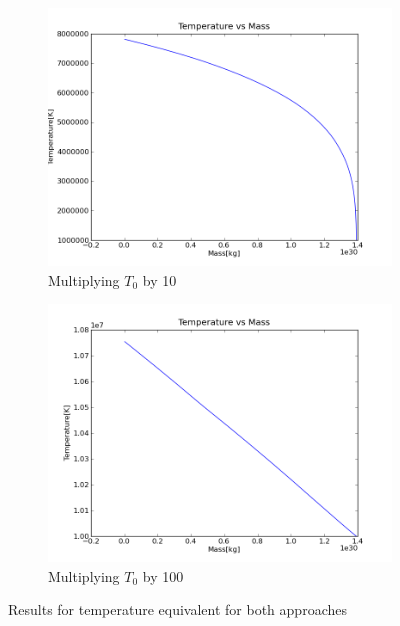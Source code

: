 \documentclass[a4paper,12pt]{article}
\begin{document}
\begin{figure}[H]
    \centering
    \begin{subfigure}{0.49\textwidth}
      \includegraphics[width=\textwidth]{Calculate_density/Temperature_for_rho_p_t_others_constant_Ttimes10}
      \caption{Multiplying $T_0$ by 10}
      \label{fig:temperature_density_Ttimes10}
    \end{subfigure}
    \begin{subfigure}{0.49\textwidth}
      \includegraphics[width=\textwidth]{Calculate_density/Temperature_for_rho_p_t_others_constant_Ttimes100}
      \caption{Multiplying $T_0$ by 100}
      \label{fig:temperature_pressure_Ttimes100}
    \end{subfigure}
    \caption{Results for temperature equivalent for both approaches}
\end{figure}
\end{document}
